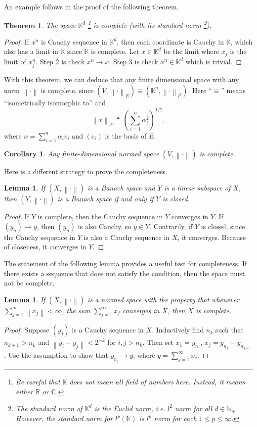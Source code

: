 \documentclass[12pt,a4paper]{report}
\numberwithin{equation}{section}
\theoremstyle{mystyle}
\newtheorem{theorem}[definition]{Theorem}
\newtheorem{lemma}[definition]{Lemma}
\newtheorem{corollary}[definition]{Corollary}
\newcommand{\R}{\mathbb{R}}
\newcommand{\N}{\mathbb{N}}
\newcommand{\K}{\mathbb{K}}
\newcommand{\norm}[1]{\left\lVert #1 \right\rVert}
\begin{document}
	An example follows in the proof of the following theorem.
	\begin{theorem}
		The space $\K^d$
		\footnote{Be careful that $\K$ does not mean all field of numbers here. Instead, it means either $\R$ or $\mathbb{C}$.}
		 is complete (with its standard norm
		 \footnote{The standard norm of $\K^d$ is the Euclid norm, i.e. $l^2$ norm for all $d\in \N_+$. However, the standard norm for $l^p(\K)$ is $l^p$ norm for each $1\leq p\leq \infty$.}).
	\end{theorem}
	\begin{proof}
		If $x^n$ is Cauchy sequence in $\K^d$, then each coordinate is Cauchy in $\K$, which also has a limit in $\K$ since $\K$ is complete. Let $x\in \K^d$ be the limit where $x_j$ is the limit of $x^n_j$. Step 2 is check $x^n\to x$. Step 3 is check $x^n\in \K^d$ which is trivial.
	\end{proof}
	With this theorem, we can deduce that any finite dimensional space with any norm $\norm{\cdot}$ is complete, since $(V,\norm{\cdot}_E)\equiv (\K^n, \norm{\cdot}_{l^2})$. Here ``$\equiv$'' means ``isometrically isomorphic to'' and 
	$$
	\norm{x}_E\triangleq \left(\sum_{i=1}^n \alpha_i^2\right)^{1/2},
	$$
	where $x=\sum_{i=1}^n \alpha_i e_i$ and $(e_i)$ is the basis of $E$.
	\begin{corollary}
		Any finite-dimensional normed space $(V,\norm{\cdot})$ is complete.
	\end{corollary}
	
	Here is a different strategy to prove the completeness.
	\begin{lemma}\label{lem:complete closed}
		If $(X,\norm{\cdot})$ is a Banach space and $Y$ is a linear subspace of $X$, then $(Y,\norm{\cdot})$ is a Banach space if and only if $Y$ is closed.
	\end{lemma}
	\begin{proof}
		If $Y$ is complete, then the Cauchy sequence in $Y$ converges in $Y$. If $(y_n)\to y$, then $(y_n)$ is also Cauchy, so $y\in Y$. Contrarily, if $Y$ is closed, since the Cauchy sequence in $Y$ is also a Cauchy sequence in $X$, it converges. Because of closeness, it converges in $Y$.
	\end{proof}
	The statement of the following lemma provides a useful test for completeness. If there exists a sequence that does not satisfy the condition, then the space must not be complete.
	\begin{lemma}
		If $(X,\norm{\cdot})$ is a normed space with the property that whenever $\sum_{j=1}^\infty \norm{x_j}<\infty$, the sum $\sum_{j=1}^\infty x_j$ converges in $X$, then $X$ is complete.
	\end{lemma}
	\begin{proof}
		Suppose $(y_j)$ is a Cauchy sequence in $X$. Inductively find $n_k$ such that $n_{k+1}>n_k$ and $\norm{y_i-y_j}<2^{-k}$ for $i,j>n_k$. Then set $x_1=y_{n_1}$, $x_j=y_{n_j}-y_{n_{j-1}}$. Use the assumption to show that $y_{n_j}\to y$, where $y=\sum_{j=1}^\infty x_j$.
	\end{proof}
\end{document}
